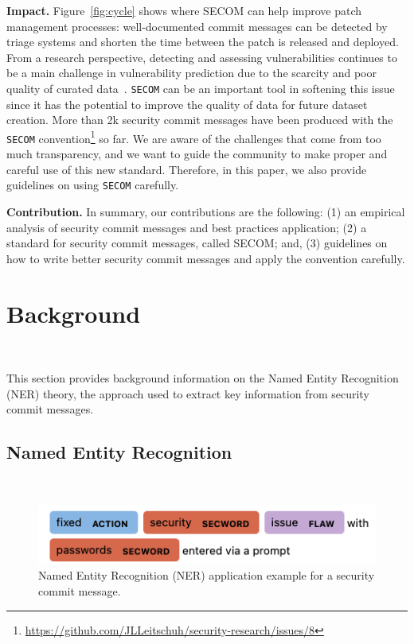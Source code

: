 \textbf{Impact.} Figure~\ref{fig:cycle} shows where SECOM can help improve patch management processes: well-documented commit messages can be detected by triage systems and shorten the time between the patch is released and deployed. 
From a research perspective, detecting and assessing vulnerabilities continues to be a main challenge in vulnerability prediction due to the scarcity
and poor quality of curated data~\cite{9448435}. 
\texttt{SECOM} can be an important tool in softening this issue since it has the potential to improve the quality of data for future dataset creation. More than 2k security commit messages have been produced with the \texttt{SECOM} convention\footnote{\url{https://github.com/JLLeitschuh/security-research/issues/8}} so far.
We are aware of the challenges that come from too much transparency, and we want to guide the community to make proper and careful use of this new standard. Therefore, in this paper, we also provide guidelines on using \texttt{SECOM} carefully.

\textbf{Contribution.} In summary, our contributions are the following: 
(1) an empirical analysis of security commit messages and best practices application; (2) a standard for security commit messages, called SECOM; and, (3) guidelines on how to write better security commit messages and apply the convention carefully.



\section{Background}~\label{sec:background}

This section provides background information on the Named Entity Recognition (NER) theory, the approach used to extract key information from security commit messages.

\subsection{Named Entity Recognition}~\label{sec:ner}

\begin{figure}[t!]
\hspace*{-0.25cm}\centering
    \includegraphics[width=\linewidth]{Figures/application.png}
    \caption{Named Entity Recognition (NER) application example for a security commit message.}\label{fig:application}
\end{figure}

